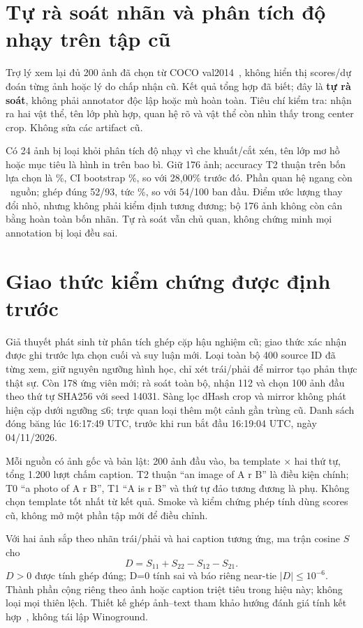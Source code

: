 \documentclass[11pt,a4paper]{article}
\begin{document}
\section{Tự rà soát nhãn và phân tích độ nhạy trên tập cũ}
Trợ lý xem lại đủ 200 ảnh đã chọn từ COCO val2014~\cite{coco}, không hiển thị scores/dự đoán từng ảnh hoặc lý do chấp nhận cũ. Kết quả tổng hợp đã biết; đây là \textbf{tự rà soát}, không phải annotator độc lập hoặc mù hoàn toàn. Tiêu chí kiểm tra: nhận ra hai vật thể, tên lớp phù hợp, quan hệ rõ và vật thể còn nhìn thấy trong center crop. Không sửa các artifact cũ.

Có 24 ảnh bị loại khỏi phân tích độ nhạy vì che khuất/cắt xén, tên lớp mơ hồ hoặc mục tiêu là hình in trên bao bì. Giữ 176 ảnh; accuracy T2 thuận trên bốn lựa chọn là \OldCleanAcc\%, CI bootstrap \OldCleanCI\%, so với 28,00\% trước đó. Phần quan hệ ngang còn \OldCleanHorizontal\ nguồn; ghép đúng 52/93, tức \OldCleanPair\%, so với 54/100 ban đầu. Điểm ước lượng thay đổi nhỏ, nhưng không phải kiểm định tương đương; bộ 176 ảnh không còn cân bằng hoàn toàn bốn nhãn. Tự rà soát vẫn chủ quan, không chứng minh mọi annotation bị loại đều sai.

\section{Giao thức kiểm chứng được định trước}
Giả thuyết phát sinh từ phân tích ghép cặp hậu nghiệm cũ; giao thức xác nhận được ghi trước lựa chọn cuối và suy luận mới. Loại toàn bộ 400 source ID đã từng xem, giữ nguyên ngưỡng hình học, chỉ xét trái/phải để mirror tạo phản thực thật sự. Còn 178 ứng viên mới; rà soát toàn bộ, nhận 112 và chọn 100 ảnh đầu theo thứ tự SHA256 với seed 14031. Sàng lọc dHash crop và mirror không phát hiện cặp dưới ngưỡng ≤6; trực quan loại thêm một cảnh gần trùng cũ. Danh sách đóng băng lúc 16:17:49 UTC, trước khi run bắt đầu 16:19:04 UTC, ngày 04/11/2026.

\newpage
Mỗi nguồn có ảnh gốc và bản lật: 200 ảnh đầu vào, ba template × hai thứ tự, tổng 1.200 lượt chấm caption. T2 thuận ``an image of A r B'' là điều kiện chính; T0 ``a photo of A r B'', T1 ``A is r B'' và thứ tự đảo tương đương là phụ. Không chọn template tốt nhất từ kết quả. Smoke và kiểm chứng phép tính dùng scores cũ, không mở một phần tập mới để điều chỉnh.

Với hai ảnh sắp theo nhãn trái/phải và hai caption tương ứng, ma trận cosine $S$ cho
\[
D=S_{11}+S_{22}-S_{12}-S_{21}.
\]
$D>0$ được tính ghép đúng; D=0 tính sai và báo riêng near-tie $|D|\leq10^{-6}$. Thành phần cộng riêng theo ảnh hoặc caption triệt tiêu trong hiệu này; không loại mọi thiên lệch. Thiết kế ghép ảnh--text tham khảo hướng đánh giá tính kết hợp~\cite{winoground}, không tái lập Winoground.
\end{document}
